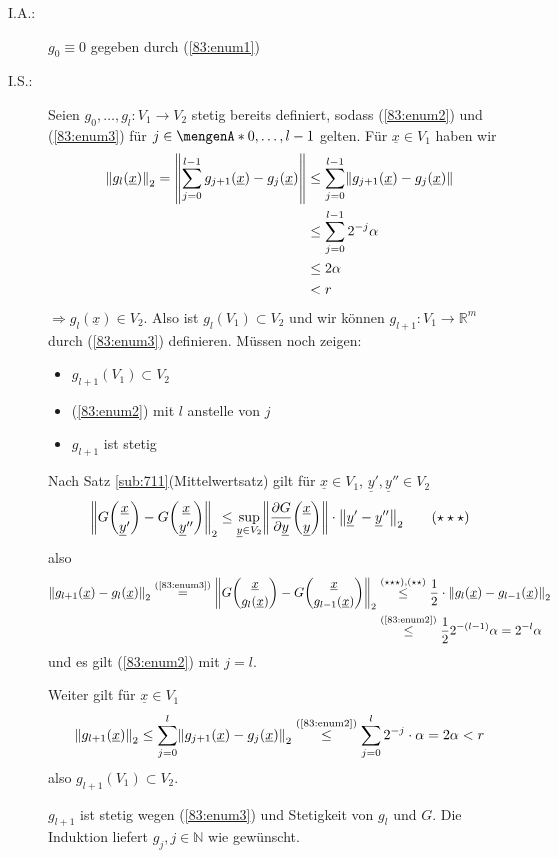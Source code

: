 \begin{description}
	\item[I.A.:] $g_0 \equiv 0 $ gegeben durch (\ref{83:enum1})
	\item[I.S.:] Seien $g_0, \ldots , g_l : V_1 \to V_2$ stetig bereits definiert, sodass (\ref{83:enum2}) und (\ref{83:enum3}) für $j \in \set{0, \ldots , l-1} $ gelten. Für 
	$\underline{x} \in V_1$ haben wir 
	\begin{align*}
		\norm[2]{g_l (\underline{x})} = \norm{\sum_{j=0}^{l-1} g_{j+1} (\underline{x}) - g_j(\underline{x})}  &\le \sum_{j=0}^{l-1} \norm{g_{j+1}{ (\underline{x}) - g_j(\underline{x})} } \\
		&\le \sum_{j=0}^{l-1} 2^{-j} \alpha  \\ &\le 2 \alpha \\ &< r
	\end{align*}
	$\Rightarrow g_l(\underline{x}) \in V_2$. Also ist $g_l (V_1) \subset V_2$ und wir können $g_{l+1} : V_1  \to \mathds{R}^m$ durch (\ref{83:enum3}) definieren. Müssen
	noch zeigen: 
	\begin{itemize}
		\item $g_{l+1}(V_1) \subset V_2$
		\item (\ref{83:enum2}) mit $l$ anstelle von $j$
		\item $g_{l+1}$ ist stetig
	\end{itemize}
	
	Nach Satz \ref{sub:711}(Mittelwertsatz) gilt für $\underline{x} \in V_1$, $\underline{y}', \underline{y}'' \in V_2 $
	\begin{align*}
		\norm[2]{G \binom{\underline{x}}{\underline{y}'} - G \binom{\underline{x}}{\underline{y}''}} \le \sup_{\underline{y} \in V_2} 
		\norm{\diff{G}{\underline{y}} \binom{\underline{x}}{\underline{y}}  } \cdot \norm[2]{\underline{y}' - \underline{y}''} \tag{$\star \star \star$}
	\end{align*}
	also
	\begin{align*}
		\norm[2]{g_{l+1} (\underline{x}) - g_l (\underline{x})}  \stackrel{\text{(\ref{83:enum3})}}{=} 
		\norm[2]{G \binom{\underline{x}}{g_l(\underline{x})}   - G \binom{\underline{x}}{g_{l-1} (\underline{x})} } &\stackrel{(\star\star\star),(\star\star)}{\le}
		\frac{1}{2}  \cdot \norm[2]{g_l (\underline{x}) - g_{l-1} (\underline{x})} \\
		&\stackrel{\text{(\ref{83:enum2})}}{\le} \frac{1}{2} 2^{-(l-1)} \alpha = 2^{-l} \alpha 
	\end{align*}
	und es gilt (\ref{83:enum2}) mit $j=l$. 
	
	Weiter gilt für $\underline{x} \in V_1$
	\begin{align*}
		\norm[2]{g_{l+1} (\underline{x})} \le \sum_{j=0}^{l} \norm[2]{g_{j+1} (\underline{x}) - g_j(\underline{x})} \stackrel{\text{(\ref{83:enum2})}}{\le} 
		\sum_{j=0}^{l} 2^{-j} \cdot \alpha = 2 \alpha< r    
	\end{align*}
	also $g_{l+1}(V_1) \subset V_2$.
	
	$g_{l+1}$ ist stetig wegen (\ref{83:enum3}) und Stetigkeit von $g_l$ und $G$. Die Induktion liefert $g_j, j \in \mathds{N}$ wie gewünscht.
\end{description}

